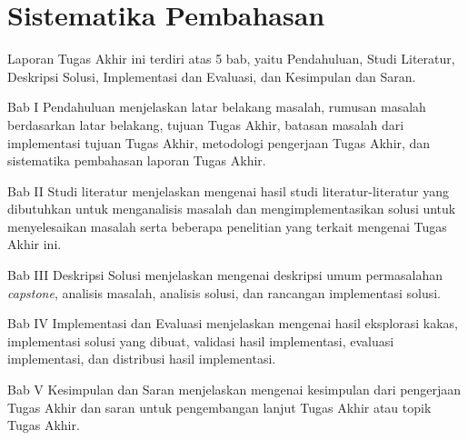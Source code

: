 \section{Sistematika Pembahasan}

Laporan Tugas Akhir ini terdiri atas 5 bab, yaitu Pendahuluan, Studi Literatur,
Deskripsi Solusi, Implementasi dan Evaluasi, dan Kesimpulan dan Saran.

Bab I Pendahuluan menjelaskan latar belakang masalah, rumusan masalah
berdasarkan latar belakang, tujuan Tugas Akhir, batasan masalah dari
implementasi tujuan Tugas Akhir, metodologi pengerjaan Tugas Akhir, dan
sistematika pembahasan laporan Tugas Akhir.

Bab II Studi literatur menjelaskan mengenai hasil studi literatur-literatur yang
dibutuhkan untuk menganalisis masalah dan mengimplementasikan solusi untuk
menyelesaikan masalah serta beberapa penelitian yang terkait mengenai Tugas
Akhir ini.

Bab III Deskripsi Solusi menjelaskan mengenai deskripsi umum permasalahan
\textit{capstone}, analisis masalah, analisis solusi, dan rancangan implementasi
solusi.

Bab IV Implementasi dan Evaluasi menjelaskan mengenai hasil eksplorasi kakas,
implementasi solusi yang dibuat, validasi hasil implementasi, evaluasi
implementasi, dan distribusi hasil implementasi.

Bab V Kesimpulan dan Saran menjelaskan mengenai kesimpulan dari pengerjaan Tugas
Akhir dan saran untuk pengembangan lanjut Tugas Akhir atau topik Tugas Akhir.
